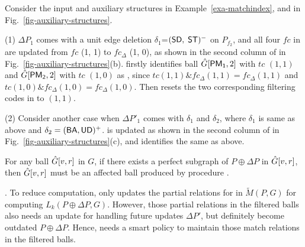 \begin{example}
\label{exa-identifyaffball}
Consider the input and auxiliary structures in Example~\ref{exa-matchindex}, and \bfc in Fig.~\ref{fig-auxiliary-structures}.

\sstab(1) $\Delta P_1$ comes with a unit edge deletion $\delta_1$=$({\mathsf{SD}},$ ${\mathsf{ST}})^-$ on $P_{f_2}$, and all four $fc$ in \bfc are updated from $fc$ (1, 1) to $fc_{\Delta}$ (1, 0), as shown in the second column of \bfc in Fig.~\ref{fig-auxiliary-structures}(b).
%
\identifyaffball firstly identifies ball $\hat{G}{[{\mathsf{PM_1}},2]}$ with $tc$ $(1, 1)$ and $\hat{G}{[{\mathsf{PM_2}},2]}$ with $tc$ $(1, 0)$ as \affballsx,
	since $tc (1, 1) \& fc_{\Delta}(1, 1) = fc_{\Delta}(1, 1)$ and $tc (1, 0) \& fc_{\Delta} (1, 0) = fc_{\Delta}(1, 0)$.
Then \identifyaffball resets the two corresponding filtering codes in \bfc to $(1, 1)$.


\sstab(2) Consider another case when $\Delta P'_1$ comes with $\delta_1$ and $\delta_2$, where $\delta_1$ is same as above and $\delta_2 = ({\mathsf{BA}},{\mathsf{UD}})^+$. \bfc is updated as shown in the second column of \bfc in Fig.~\ref{fig-auxiliary-structures}(c), and \identifyaffball identifies the same \affballsx as above.
\end{example}



\begin{prop}
\label{prop-canaffballs}
For any ball $\hat{G}{[v,r]}$ in $G$, if there exists a perfect subgraph of $P\oplus \Delta P$ in $\hat{G}{[v,r]}$,
then $\hat{G}{[v,r]}$ must be an affected ball produced by procedure \identifyaffball.
\end{prop}



. To reduce computation, \incp only updates the partial relations for \affballsx in $\tilde{M}(P,G)$ for computing  $L_k(P\oplus \Delta P, G)$.
However, those partial relations in the filtered balls also needs an update for handling future updates $\Delta P'$, but
definitely become outdated \wrt $P\oplus \Delta P$.
Hence, \incp needs a smart policy to maintain those match relations in the filtered balls.


